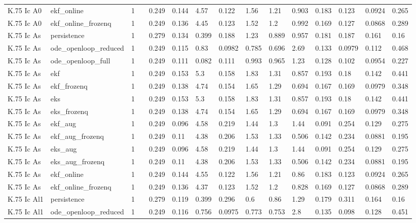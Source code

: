 \begin{table}[t]
\begin{tabular}{lllllllllllllll}
K.75 Ic A0 & ekf\_online & 1 &  & 0.249 & 0.144 & 4.57 & 0.122 & 1.56 & 1.21 & 0.903 & 0.183 & 0.123 & 0.0924 & 0.265 \\
K.75 Ic A0 & ekf\_online\_frozenq & 1 &  & 0.249 & 0.136 & 4.45 & 0.123 & 1.52 & 1.2 & 0.992 & 0.169 & 0.127 & 0.0868 & 0.289 \\
K.75 Ic As & persistence & 1 &  & 0.279 & 0.134 & 0.399 & 0.188 & 1.23 & 0.889 & 0.957 & 0.181 & 0.187 & 0.161 & 0.16 \\
K.75 Ic As & ode\_openloop\_reduced & 1 &  & 0.249 & 0.115 & 0.83 & 0.0982 & 0.785 & 0.696 & 2.69 & 0.133 & 0.0979 & 0.112 & 0.468 \\
K.75 Ic As & ode\_openloop\_full & 1 &  & 0.249 & 0.111 & 0.082 & 0.111 & 0.993 & 0.965 & 1.23 & 0.128 & 0.102 & 0.0954 & 0.227 \\
K.75 Ic As & ekf & 1 &  & 0.249 & 0.153 & 5.3 & 0.158 & 1.83 & 1.31 & 0.857 & 0.193 & 0.18 & 0.142 & 0.441 \\
K.75 Ic As & ekf\_frozenq & 1 &  & 0.249 & 0.138 & 4.74 & 0.154 & 1.65 & 1.29 & 0.694 & 0.167 & 0.169 & 0.0979 & 0.348 \\
K.75 Ic As & eks & 1 &  & 0.249 & 0.153 & 5.3 & 0.158 & 1.83 & 1.31 & 0.857 & 0.193 & 0.18 & 0.142 & 0.441 \\
K.75 Ic As & eks\_frozenq & 1 &  & 0.249 & 0.138 & 4.74 & 0.154 & 1.65 & 1.29 & 0.694 & 0.167 & 0.169 & 0.0979 & 0.348 \\
K.75 Ic As & ekf\_aug & 1 &  & 0.249 & 0.096 & 4.58 & 0.219 & 1.44 & 1.3 & 1.44 & 0.091 & 0.254 & 0.129 & 0.275 \\
K.75 Ic As & ekf\_aug\_frozenq & 1 &  & 0.249 & 0.11 & 4.38 & 0.206 & 1.53 & 1.33 & 0.506 & 0.142 & 0.234 & 0.0881 & 0.195 \\
K.75 Ic As & eks\_aug & 1 &  & 0.249 & 0.096 & 4.58 & 0.219 & 1.44 & 1.3 & 1.44 & 0.091 & 0.254 & 0.129 & 0.275 \\
K.75 Ic As & eks\_aug\_frozenq & 1 &  & 0.249 & 0.11 & 4.38 & 0.206 & 1.53 & 1.33 & 0.506 & 0.142 & 0.234 & 0.0881 & 0.195 \\
K.75 Ic As & ekf\_online & 1 &  & 0.249 & 0.144 & 4.55 & 0.122 & 1.56 & 1.21 & 0.86 & 0.183 & 0.123 & 0.0924 & 0.265 \\
K.75 Ic As & ekf\_online\_frozenq & 1 &  & 0.249 & 0.136 & 4.37 & 0.123 & 1.52 & 1.2 & 0.828 & 0.169 & 0.127 & 0.0868 & 0.289 \\
K.75 Ic Al1 & persistence & 1 &  & 0.279 & 0.119 & 0.399 & 0.296 & 0.6 & 0.86 & 1.29 & 0.179 & 0.311 & 0.164 & 0.16 \\
K.75 Ic Al1 & ode\_openloop\_reduced & 1 &  & 0.249 & 0.116 & 0.756 & 0.0975 & 0.773 & 0.753 & 2.8 & 0.135 & 0.098 & 0.128 & 0.451 \\

\end{tabular}
\end{table}
